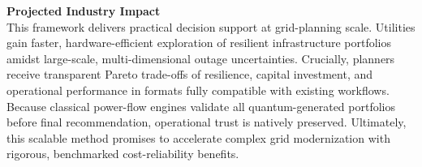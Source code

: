 \documentclass[11pt]{article}
\begin{document}
\noindent\textbf{Projected Industry Impact}\\
This framework delivers practical decision support at grid-planning scale. Utilities gain faster, hardware-efficient exploration of resilient infrastructure portfolios amidst large-scale, multi-dimensional outage uncertainties. Crucially, planners receive transparent Pareto trade-offs of resilience, capital investment, and operational performance in formats fully compatible with existing workflows. Because classical power-flow engines validate all quantum-generated portfolios before final recommendation, operational trust is natively preserved. Ultimately, this scalable method promises to accelerate complex grid modernization with rigorous, benchmarked cost-reliability benefits.
\end{document}
